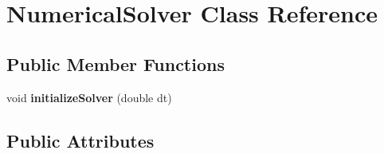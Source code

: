\section{Numerical\+Solver Class Reference}
\label{class_numerical_solver}
\subsection*{Public Member Functions}
\begin{DoxyCompactItemize}
\item 
void {\bfseries initialize\+Solver} (double dt)\label{class_numerical_solver_ac91717b927990eae2c14f01b4f5d14bc}

\end{DoxyCompactItemize}
\subsection*{Public Attributes}
